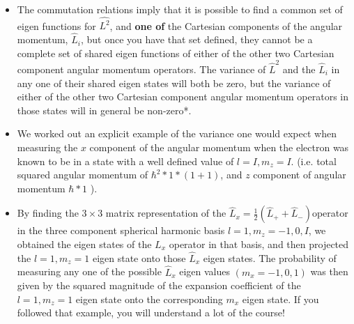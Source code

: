 \documentclass{article}
\begin{document}
\begin{itemize}
\begin{itemize}
        \item The commutation relations imply that it is possible to find a common set of eigen functions for $\widehat{L^{2}}$, and \textbf{one of} the Cartesian components of the angular momentum, $\widehat{L}_{i}$, but once you have that set defined, they cannot be a complete set of shared eigen functions of either of the other two Cartesian component angular momentum operators. The variance of $\widehat{L}^{2}$ and the $\widehat{L}_{i}$ in any one of their shared eigen states will both be zero, but the variance of either of the other two Cartesian component angular momentum operators in those states will in general be non-zero*.
        \item We worked out an explicit example of the variance one would expect when measuring the $x$ component of the angular momentum when the electron was known to be in a state with a well defined value of $l=I, m_{z}=I$. (i.e. total squared angular momentum of $\hbar^{2} * 1 *(1+1)$, and $z$ component of angular momentum $\hbar * 1$ ).
        \item By finding the $3 \times 3$ matrix representation of the $\hat{L}_{x}=\frac{1}{2}\left(\hat{L}_{+}+\widehat{L}_{-}\right)$operator in the three component spherical harmonic basis $l=1, m_{z}=-1,0, I$, we obtained the eigen states of the ${L}_{x}$ operator in that basis, and then projected the $l=1, m_{z}=1$ eigen state onto those $\hat{L}_{x}$ eigen states. The probability of measuring any one of the possible $\hat{L}_{x}$ eigen values $\left(m_{x}=-1,0,1\right)$ was then given by the squared magnitude of the expansion coefficient of the $l=1, m_{z}=1$ eigen state onto the corresponding $m_{x}$ eigen state. If you followed that example, you will understand a lot of the course!
    \end{itemize}
\end{itemize}
\end{document}
